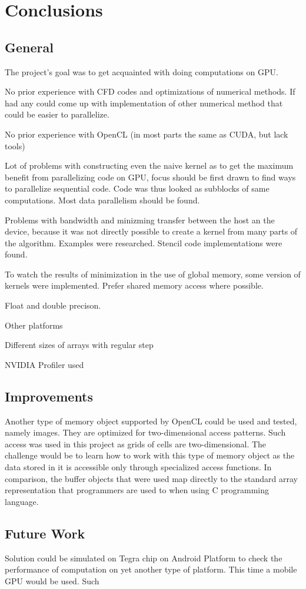\chapter{Conclusions}
\section{General}
The project's goal was to get acquainted with doing computations on GPU.

No prior experience with CFD codes and optimizations of numerical methods. If had any could come up with implementation of other numerical method that could be easier to parallelize. 

No prior experience with OpenCL (in most parts the same as CUDA, but lack tools)

Lot of problems with constructing even the naive kernel as to get the maximum benefit from parallelizing code on GPU, focus should be first drawn to find ways to parallelize sequential code. Code was thus looked as subblocks of same computations. Most data parallelism should be found.

Problems with bandwidth and minizming transfer between the host an the device, because it was not directly possible to create a kernel from many parts of the algorithm. Examples were researched. Stencil code implementations were found.

To watch the results of minimization in the use of global memory, some version of kernels were implemented. Prefer shared memory access where possible. 


Float and double precison.

Other platforms

Different sizes of arrays with regular step

NVIDIA Profiler used

\section{Improvements}
Another type of memory object supported by OpenCL could be used and tested, namely images. They are optimized for two-dimensional access patterns. Such access was used in this project as grids of cells are two-dimensional. The challenge would be to learn how to work with this type of memory object as the data stored in it is accessible only through specialized access functions. In comparison, the buffer objects that were used map directly to the standard array representation that programmers are used to when using C programming language.


\section{Future Work}

Solution could be simulated on Tegra chip on Android Platform to check the performance of computation on yet another type of platform. This time a mobile GPU would be used. Such
